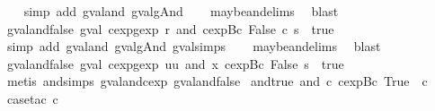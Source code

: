 \begin{isabellebody}
%
\isadelimproof
\ \ %
\endisadelimproof
%
\isatagproof
{}\isamarkupfalse%
\ {\isacharparenleft}simp\ add{\isacharcolon}\ gval{\isacharunderscore}and\ gval{\isacharunderscore}gAnd{\isacharparenright}\isanewline
\ \ \isamarkupfalse%
\ maybe{\isacharunderscore}and{\isachardot}elims\ \isamarkupfalse%
\ blast%
\endisatagproof
{\isafoldproof}%
%
\isadelimproof
\isanewline
%
\endisadelimproof
\isanewline
{}\isamarkupfalse%
\ gval{\isacharunderscore}and{\isacharunderscore}false{\isacharcolon}\ {\isachardoublequoteopen}gval\ {\isacharparenleft}cexp{}gexp\ r\ {\isacharparenleft}and\ {\isacharparenleft}cexp{\isachardot}Bc\ False{\isacharparenright}\ c{\isacharparenright}{\isacharparenright}\ s\ {\isasymnoteq}\ true{\isachardoublequoteclose}\isanewline
%
\isadelimproof
\ \ %
\endisadelimproof
%
\isatagproof
{}\isamarkupfalse%
\ {\isacharparenleft}simp\ add{\isacharcolon}\ gval{\isacharunderscore}and\ gval{\isacharunderscore}gAnd\ gval{\isachardot}simps{\isacharparenleft}{}{\isacharparenright}{\isacharparenright}\isanewline
\ \ \isamarkupfalse%
\ maybe{\isacharunderscore}and{\isachardot}elims\ \isamarkupfalse%
\ blast%
\endisatagproof
{\isafoldproof}%
%
\isadelimproof
\isanewline
%
\endisadelimproof
\isanewline
{}\isamarkupfalse%
\ gval{\isacharunderscore}and{\isacharunderscore}false{\isacharunderscore}{}{\isacharcolon}\ {\isachardoublequoteopen}gval\ {\isacharparenleft}cexp{}gexp\ uu\ {\isacharparenleft}and\ x\ {\isacharparenleft}cexp{\isachardot}Bc\ False{\isacharparenright}{\isacharparenright}{\isacharparenright}\ s\ {\isasymnoteq}\ true{\isachardoublequoteclose}\isanewline
%
\isadelimproof
\ \ %
\endisadelimproof
%
\isatagproof
{}\isamarkupfalse%
\ {\isacharparenleft}metis\ and{\isachardot}simps{\isacharparenleft}{}{}{\isacharparenright}\ gval{\isacharunderscore}and{\isacharunderscore}cexp\ gval{\isacharunderscore}and{\isacharunderscore}false{\isacharparenright}%
\endisatagproof
{\isafoldproof}%
%
\isadelimproof
\isanewline
%
\endisadelimproof
\isanewline
{}\isamarkupfalse%
\ and{\isacharunderscore}true{\isacharcolon}\ {\isachardoublequoteopen}and\ c\ {\isacharparenleft}cexp{\isachardot}Bc\ True{\isacharparenright}\ {\isacharequal}\ c{\isachardoublequoteclose}\isanewline
%
\isadelimproof
\ \ %
\endisadelimproof
%
\isatagproof
{}\isamarkupfalse%
\ {\isacharparenleft}case{\isacharunderscore}tac\ c{\isacharparenright}\isanewline

\end{isabellebody}
